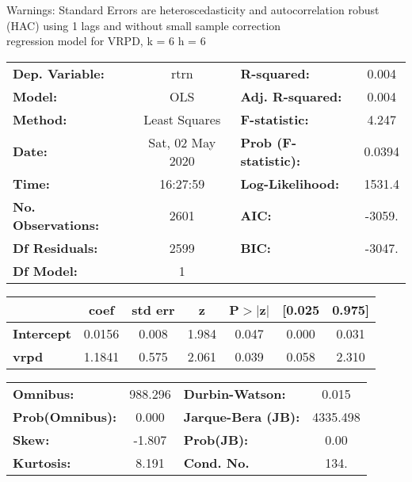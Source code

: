 Warnings: \newline
 [1] Standard Errors are heteroscedasticity and autocorrelation robust (HAC) using 1 lags and without small sample correction\\ 

regression model for VRPD, k = 6 h = 6\begin{center}
\begin{tabular}{lclc}
\toprule
\textbf{Dep. Variable:}    &       rtrn       & \textbf{  R-squared:         } &     0.004   \\
\textbf{Model:}            &       OLS        & \textbf{  Adj. R-squared:    } &     0.004   \\
\textbf{Method:}           &  Least Squares   & \textbf{  F-statistic:       } &     4.247   \\
\textbf{Date:}             & Sat, 02 May 2020 & \textbf{  Prob (F-statistic):} &   0.0394    \\
\textbf{Time:}             &     16:27:59     & \textbf{  Log-Likelihood:    } &    1531.4   \\
\textbf{No. Observations:} &        2601      & \textbf{  AIC:               } &    -3059.   \\
\textbf{Df Residuals:}     &        2599      & \textbf{  BIC:               } &    -3047.   \\
\textbf{Df Model:}         &           1      & \textbf{                     } &             \\
\bottomrule
\end{tabular}
\begin{tabular}{lcccccc}
                   & \textbf{coef} & \textbf{std err} & \textbf{z} & \textbf{P$> |$z$|$} & \textbf{[0.025} & \textbf{0.975]}  \\
\midrule
\textbf{Intercept} &       0.0156  &        0.008     &     1.984  &         0.047        &        0.000    &        0.031     \\
\textbf{vrpd}      &       1.1841  &        0.575     &     2.061  &         0.039        &        0.058    &        2.310     \\
\bottomrule
\end{tabular}
\begin{tabular}{lclc}
\textbf{Omnibus:}       & 988.296 & \textbf{  Durbin-Watson:     } &    0.015  \\
\textbf{Prob(Omnibus):} &   0.000 & \textbf{  Jarque-Bera (JB):  } & 4335.498  \\
\textbf{Skew:}          &  -1.807 & \textbf{  Prob(JB):          } &     0.00  \\
\textbf{Kurtosis:}      &   8.191 & \textbf{  Cond. No.          } &     134.  \\
\bottomrule
\end{tabular}
\end{center}

